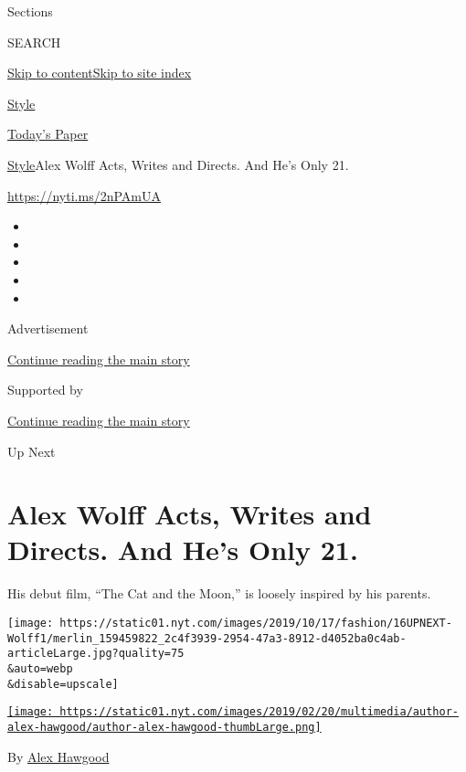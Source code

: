 Sections

SEARCH

\protect\hyperlink{site-content}{Skip to
content}\protect\hyperlink{site-index}{Skip to site index}

\href{https://www.nytimes.com/section/style}{Style}

\href{https://myaccount.nytimes.com/auth/login?response_type=cookie\&client_id=vi}{}

\href{https://www.nytimes.com/section/todayspaper}{Today's Paper}

\href{/section/style}{Style}\textbar{}Alex Wolff Acts, Writes and
Directs. And He's Only 21.

\href{https://nyti.ms/2nPAmUA}{https://nyti.ms/2nPAmUA}

\begin{itemize}
\item
\item
\item
\item
\item
\end{itemize}

Advertisement

\protect\hyperlink{after-top}{Continue reading the main story}

Supported by

\protect\hyperlink{after-sponsor}{Continue reading the main story}

Up Next

\hypertarget{alex-wolff-acts-writes-and-directs-and-hes-only-21}{%
\section{Alex Wolff Acts, Writes and Directs. And He's Only
21.}\label{alex-wolff-acts-writes-and-directs-and-hes-only-21}}

His debut film, ``The Cat and the Moon,'' is loosely inspired by his
parents.

\texttt{[image: https://static01.nyt.com/images/2019/10/17/fashion/16UPNEXT-Wolff1/merlin\_159459822\_2c4f3939-2954-47a3-8912-d4052ba0c4ab-articleLarge.jpg?quality=75\\\&auto=webp\\\&disable=upscale]}

\href{https://www.nytimes.com/by/alex-hawgood}{\texttt{[image: https://static01.nyt.com/images/2019/02/20/multimedia/author-alex-hawgood/author-alex-hawgood-thumbLarge.png]}}

By \href{https://www.nytimes.com/by/alex-hawgood}{Alex Hawgood}


